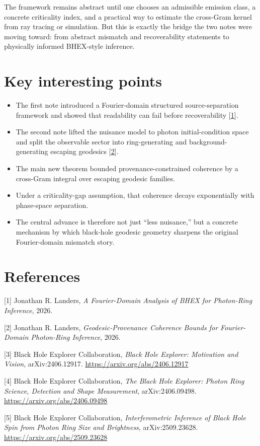 \documentclass[10pt,letterpaper,twocolumn]{article}
\providecommand{\tightlist}{%
  \setlength{\itemsep}{0pt}\setlength{\parskip}{0pt}}
\begin{document}
The framework remains abstract until one chooses an admissible emission class, a concrete criticality
index, and a practical way to estimate the cross-Gram kernel from ray tracing or simulation. But this is
exactly the bridge the two notes were moving toward: from abstract mismatch and recoverability statements
to physically informed BHEX-style inference.

\section{Key interesting points}

\begin{itemize}
\tightlist
\item The first note introduced a Fourier-domain structured source-separation framework and showed that
readability can fail before recoverability [\hyperlink{ref-1}{1}].
\item The second note lifted the nuisance model to photon initial-condition space and split the observable
sector into ring-generating and background-generating escaping geodesics [\hyperlink{ref-2}{2}].
\item The main new theorem bounded provenance-constrained coherence by a cross-Gram integral over escaping
geodesic families.
\item Under a criticality-gap assumption, that coherence decays exponentially with phase-space separation.
\item The central advance is therefore not just ``less nuisance,'' but a concrete mechanism by which
black-hole geodesic geometry sharpens the original Fourier-domain mismatch story.
\end{itemize}

\section*{References}

\noindent{}\hypertarget{ref-1}{}{[}1{]} Jonathan R. Landers,
\emph{A Fourier-Domain Analysis of BHEX for Photon-Ring Inference}, 2026.

\noindent{}\hypertarget{ref-2}{}{[}2{]} Jonathan R. Landers,
\emph{Geodesic-Provenance Coherence Bounds for Fourier-Domain Photon-Ring Inference}, 2026.

\noindent{}\hypertarget{ref-3}{}{[}3{]} Black Hole Explorer Collaboration,
\emph{Black Hole Explorer: Motivation and Vision}, arXiv:2406.12917.
\url{https://arxiv.org/abs/2406.12917}

\noindent{}\hypertarget{ref-4}{}{[}4{]} Black Hole Explorer Collaboration,
\emph{The Black Hole Explorer: Photon Ring Science, Detection and Shape Measurement},
arXiv:2406.09498. \url{https://arxiv.org/abs/2406.09498}

\noindent{}\hypertarget{ref-5}{}{[}5{]} Black Hole Explorer Collaboration,
\emph{Interferometric Inference of Black Hole Spin from Photon Ring Size and Brightness},
arXiv:2509.23628. \url{https://arxiv.org/abs/2509.23628}
\end{document}
